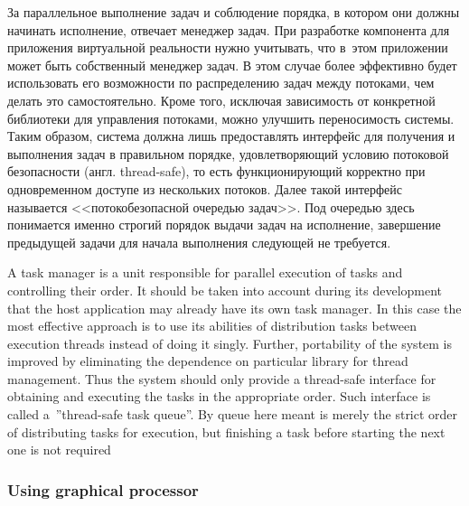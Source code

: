 \documentclass[a4paper, 12pt, titlepage]{extarticle}
\newcommand{\eng}[1]{#1}
\begin{document}
\begin{original}
        За параллельное выполнение задач и соблюдение порядка, в котором они должны начинать
        исполнение, отвечает менеджер задач. При разработке компонента
        для приложения виртуальной реальности нужно учитывать, что в~этом приложении
        может быть собственный менеджер задач. В этом случае более эффективно
        будет использовать его возможности по распределению задач между потоками, чем делать это
        самостоятельно. Кроме того, исключая зависимость от конкретной библиотеки для управления
        потоками, можно улучшить переносимость системы. Таким образом, система должна лишь
        предоставлять интерфейс для получения и выполнения задач в правильном порядке,
        удовлетворяющий условию потоковой безопасности (англ. \eng{thread-safe}), то есть
        функционирующий корректно при одновременном доступе из нескольких потоков. Далее такой
        интерфейс называется <<потокобезопасной очередью задач>>. Под очередью здесь понимается именно строгий порядок выдачи
        задач на исполнение, завершение предыдущей задачи для начала выполнения следующей не требуется.
\end{original}

        A task manager is a unit responsible for parallel execution of tasks and controlling their
        order. It should be taken into account during its development that the host application may
        already have its own task manager. In this case the most effective approach is to use its
        abilities of distribution tasks between execution threads instead of doing it singly.
        Further, portability of the system is improved by eliminating the dependence on particular
        library for thread management. Thus the system should only provide a thread-safe interface
        for obtaining and executing the tasks in the appropriate order. Such interface is called
        a~''thread-safe task queue''. By queue here meant is merely the strict order of distributing
        tasks for execution, but finishing a task before starting the next one is not required

      \subsubsection{Using graphical processor}\label{sssec:using_gpu}
\end{document}

